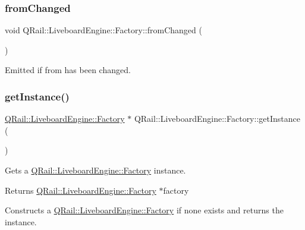 \subsubsection{\texorpdfstring{fromChanged}{fromChanged}}
{\footnotesize\ttfamily void Q\+Rail\+::\+Liveboard\+Engine\+::\+Factory\+::from\+Changed (\begin{DoxyParamCaption}{ }\end{DoxyParamCaption})\hspace{0.3cm}{\ttfamily [signal]}}



Emitted if from has been changed. 

\mbox{\label{classQRail_1_1LiveboardEngine_1_1Factory_a08e37a6538aad6341edf7066f10a63c7}} 
\subsubsection{\texorpdfstring{getInstance()}{getInstance()}}
{\footnotesize\ttfamily \mbox{\hyperlink{classQRail_1_1LiveboardEngine_1_1Factory}{Q\+Rail\+::\+Liveboard\+Engine\+::\+Factory}} $\ast$ Q\+Rail\+::\+Liveboard\+Engine\+::\+Factory\+::get\+Instance (\begin{DoxyParamCaption}{ }\end{DoxyParamCaption})\hspace{0.3cm}{\ttfamily [static]}}



Gets a \mbox{\hyperlink{classQRail_1_1LiveboardEngine_1_1Factory}{Q\+Rail\+::\+Liveboard\+Engine\+::\+Factory}} instance. 

\begin{DoxyReturn}{Returns}
\mbox{\hyperlink{classQRail_1_1LiveboardEngine_1_1Factory}{Q\+Rail\+::\+Liveboard\+Engine\+::\+Factory}} $\ast$factory
\end{DoxyReturn}
Constructs a \mbox{\hyperlink{classQRail_1_1LiveboardEngine_1_1Factory}{Q\+Rail\+::\+Liveboard\+Engine\+::\+Factory}} if none exists and returns the instance. \mbox{\label{classQRail_1_1LiveboardEngine_1_1Factory_adc3e3cb8c87171641f33f77367074a02}} 
